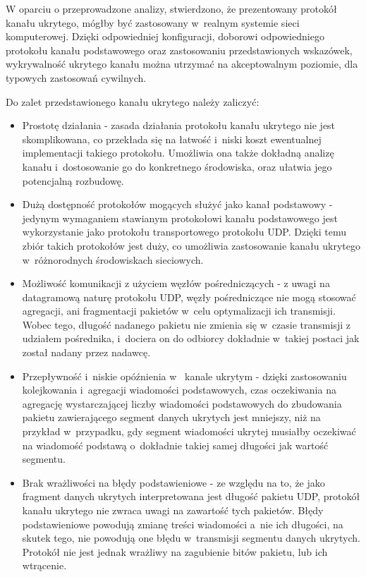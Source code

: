 \documentclass[a4paper, twoside, 12pt]{report}
\begin{document}
    W oparciu o  przeprowadzone analizy, stwierdzono, że prezentowany protokół
    kanału ukrytego, mógłby być zastosowany w~realnym systemie sieci komputerowej.
    Dzięki odpowiedniej konfiguracji, doborowi odpowiedniego protokołu kanału
    podstawowego oraz zastosowaniu przedstawionych wskazówek,
    wykrywalność ukrytego kanału można utrzymać na akceptowalnym
    poziomie, dla typowych zastosowań cywilnych.

    Do zalet przedstawionego kanału ukrytego należy zaliczyć:
    \begin{itemize}
        \item Prostotę działania - zasada działania protokołu kanału ukrytego
            nie jest skomplikowana, co przekłada się na łatwość i~niski koszt
            ewentualnej implementacji takiego protokołu. Umożliwia ona także
            dokładną analizę kanału i~dostosowanie go do konkretnego środowiska,
            oraz ułatwia jego potencjalną rozbudowę.
        \item Dużą dostępność protokołów mogących służyć jako kanał podstawowy -
            jedynym wymaganiem stawianym protokołowi kanału podstawowego jest
            wykorzystanie jako protokołu transportowego protokołu UDP. Dzięki temu
            zbiór takich protokołów jest duży, co umożliwia zastosowanie kanału
            ukrytego w~różnorodnych środowiskach sieciowych.
        \item Możliwość komunikacji z użyciem węzłów pośredniczących - z uwagi
            na datagramową naturę protokołu UDP, węzły pośredniczące nie mogą stosować
            agregacji, ani fragmentacji pakietów w~celu optymalizacji ich transmisji.
            Wobec tego, długość nadanego pakietu nie zmienia się w~czasie transmisji
            z udziałem pośrednika, i~dociera on do odbiorcy dokładnie w~takiej postaci
            jak został nadany przez nadawcę.
        \item Przepływność i~niskie opóźnienia w~ kanale ukrytym - dzięki
            zastosowaniu kolejkowania i~agregacji wiadomości podstawowych,
            czas oczekiwania na agregację wystarczającej liczby wiadomości podstawowych do zbudowania
            pakietu zawierającego segment danych ukrytych jest mniejszy, niż na przykład
            w~przypadku, gdy segment wiadomości ukrytej musiałby oczekiwać na
            wiadomość podstawą o~dokładnie takiej samej długości jak wartość segmentu.
        \item Brak wrażliwości na błędy podstawieniowe - ze względu na to, że jako
            fragment danych ukrytych interpretowana jest długość pakietu UDP, protokół
            kanału ukrytego nie zwraca uwagi na zawartość tych pakietów.
            Błędy podstawieniowe powodują zmianę treści wiadomości a~nie ich długości, na skutek tego,
            nie powodują one błędu w~transmisji segmentu danych ukrytych. Protokół
            nie jest jednak wrażliwy na zagubienie bitów pakietu, lub ich wtrącenie.
    \end{itemize}
\end{document}
